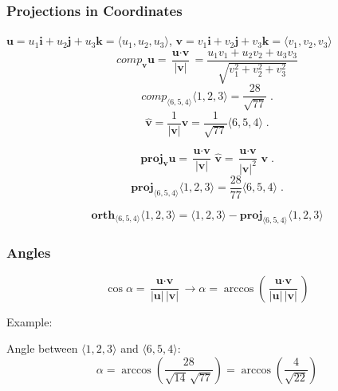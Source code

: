 \begin{frame}
  \frametitle{Projections in Coordinates}

$\textbf{u} = u_1 \textbf{i} + u_2 \textbf{j} + u_3 \textbf{k} = \langle u_1, u_2, u_3 \rangle$,
 $\textbf{v}=v_1 \textbf{i} + v_2 \textbf{j} + v_3 \textbf{k} = \langle v_1, v_2, v_3 \rangle$
%
$$comp_{\bm{v}} \textbf{u} = \frac{\textbf{u}\cdot \textbf{v}}{|\textbf{v}|} =
\frac{u_1v_1+u_2v_2+u_3v_3}{\sqrt{v_1^2+v_2^2+v_3^2}}$$
%
$$comp_{\langle 6,5,4\rangle} \langle 1,2,3\rangle = \frac{28}{\sqrt{77}}\; .$$
%
$$\hat{\textbf{v}} = \frac{1}{|\textbf{v}|} \textbf{v} =
\frac{1}{\sqrt{77}} \langle 6,5,4\rangle\; .$$

$$\textbf{proj}_{\bm{v}} \textbf{u} = \frac{\textbf{u} \cdot \textbf{v}}{|\textbf{v}|} \, \widehat{\textbf{v}} =
\frac{\textbf{u} \cdot \textbf{v}}{|\textbf{v}|^2} \, \textbf{v}\; .$$
%
$$\textbf{proj}_{\langle 6,5,4\rangle} \langle 1,2,3\rangle = \frac{28}{77} \langle 6,5,4\rangle\; .$$

$$\textbf{orth}_{\langle 6,5,4\rangle} \langle 1,2,3\rangle = \langle 1,2,3\rangle -
\textbf{proj}_{\langle 6,5,4\rangle} \langle 1,2,3\rangle$$

\end{frame}

\begin{frame}
 \frametitle{Angles}

$$\cos{\alpha} = \frac{\textbf{u} \cdot \textbf{v}}{|\textbf{u}|\, |\textbf{v}|} \to \alpha =
\arccos{\left( \frac{\textbf{u} \cdot \textbf{v}}{|\textbf{u}|\, |\textbf{v}|} \right)}$$

Example:

\bigskip

Angle between $\langle 1,2,3\rangle$ and $\langle 6,5,4\rangle$:
%
$$\alpha = \arccos{\left( \frac{28}{\sqrt{14}\, \sqrt{77}} \right)} =
\arccos{\left( \frac{4}{\sqrt{22}} \right)}$$

\end{frame}


